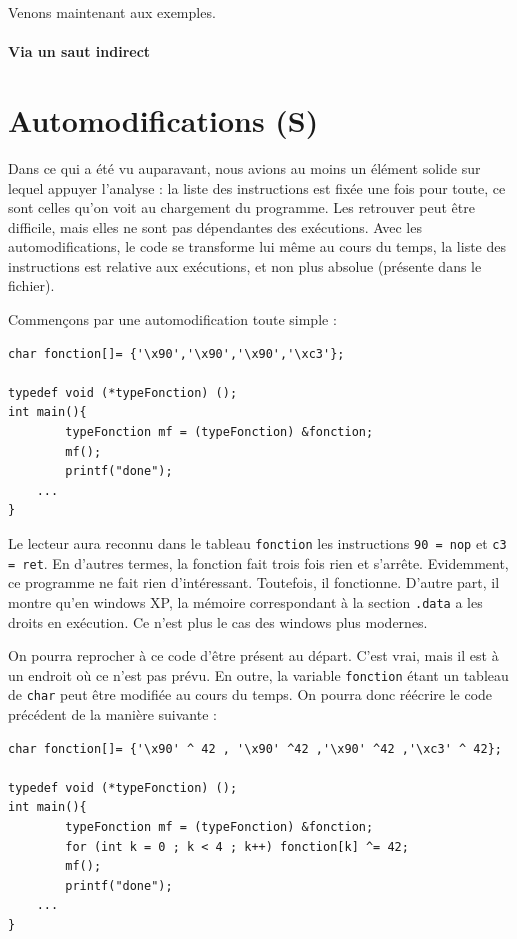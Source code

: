 \documentclass{book}
\begin{document}
Venons maintenant aux exemples. 

\paragraph{Via un saut indirect}



\section{Automodifications (S)}

Dans ce qui a été vu auparavant, nous avions au moins un élément solide sur lequel appuyer l'analyse : la liste des instructions est fixée une fois pour toute, ce sont celles qu'on voit au chargement du programme. Les retrouver peut être difficile, mais elles ne sont pas dépendantes des exécutions. Avec les automodifications, le code se transforme lui même au cours du temps, la liste des instructions est relative aux exécutions, et non plus absolue (présente dans le fichier). 

Commençons par une automodification toute simple : 

\begin{verbatim}
char fonction[]= {'\x90','\x90','\x90','\xc3'};

typedef void (*typeFonction) (); 
int main(){
        typeFonction mf = (typeFonction) &fonction;
        mf();
        printf("done");
	...
}
\end{verbatim}

Le lecteur aura reconnu dans le tableau {\tt fonction} les instructions {\tt 90 = nop} et {\tt c3 = ret}. En d'autres termes, la fonction  fait trois fois rien et s'arrête. Evidemment, ce programme ne fait rien d'intéressant. Toutefois, il fonctionne. D'autre part, il montre qu'en {\sc windows XP}, la mémoire correspondant à la section {\tt .data} a les droits en exécution. Ce n'est plus le cas des {\sc windows} plus modernes.  

On pourra reprocher à ce code d'être présent au départ. C'est vrai, mais il est à un endroit où ce n'est pas prévu. En outre, la variable {\tt fonction} étant un tableau de {\tt char} peut être modifiée au cours du temps. On pourra donc réécrire le code précédent de la manière suivante : 

\begin{verbatim}
char fonction[]= {'\x90' ^ 42 , '\x90' ^42 ,'\x90' ^42 ,'\xc3' ^ 42};

typedef void (*typeFonction) (); 
int main(){
        typeFonction mf = (typeFonction) &fonction;
        for (int k = 0 ; k < 4 ; k++) fonction[k] ^= 42;
        mf();
        printf("done");
	...
}
\end{verbatim}
\end{document}
